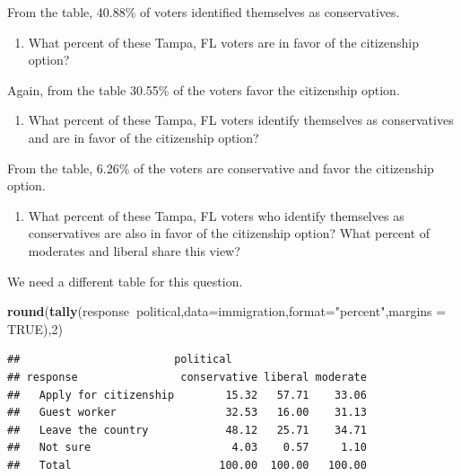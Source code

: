 \documentclass[
]{book}
\newenvironment{Shaded}{\begin{snugshade}}{\end{snugshade}}
\newcommand{\DataTypeTok}[1]{\textcolor[rgb]{0.13,0.29,0.53}{#1}}
\newcommand{\DecValTok}[1]{\textcolor[rgb]{0.00,0.00,0.81}{#1}}
\newcommand{\KeywordTok}[1]{\textcolor[rgb]{0.13,0.29,0.53}{\textbf{#1}}}
\newcommand{\NormalTok}[1]{#1}
\newcommand{\OperatorTok}[1]{\textcolor[rgb]{0.81,0.36,0.00}{\textbf{#1}}}
\newcommand{\OtherTok}[1]{\textcolor[rgb]{0.56,0.35,0.01}{#1}}
\newcommand{\StringTok}[1]{\textcolor[rgb]{0.31,0.60,0.02}{#1}}
\providecommand{\tightlist}{%
  \setlength{\itemsep}{0pt}\setlength{\parskip}{0pt}}
\begin{document}
From the table, 40.88\% of voters identified themselves as conservatives.

\begin{enumerate}
\def\labelenumi{\alph{enumi}.}
\setcounter{enumi}{3}
\tightlist
\item
  What percent of these Tampa, FL voters are in favor of the citizenship option?
\end{enumerate}

Again, from the table 30.55\% of the voters favor the citizenship option.

\begin{enumerate}
\def\labelenumi{\alph{enumi}.}
\setcounter{enumi}{4}
\tightlist
\item
  What percent of these Tampa, FL voters identify themselves as conservatives and are in favor of the citizenship option?
\end{enumerate}

From the table, 6.26\% of the voters are conservative and favor the citizenship option.

\begin{enumerate}
\def\labelenumi{\alph{enumi}.}
\setcounter{enumi}{5}
\tightlist
\item
  What percent of these Tampa, FL voters who identify themselves as conservatives are also in favor of the citizenship option? What percent of moderates and liberal share this view?
\end{enumerate}

We need a different table for this question.

\begin{Shaded}
\begin{Highlighting}[]
\KeywordTok{round}\NormalTok{(}\KeywordTok{tally}\NormalTok{(response}\OperatorTok{~}\NormalTok{political,}\DataTypeTok{data=}\NormalTok{immigration,}\DataTypeTok{format=}\StringTok{"percent"}\NormalTok{,}\DataTypeTok{margins =} \OtherTok{TRUE}\NormalTok{),}\DecValTok{2}\NormalTok{)}
\end{Highlighting}
\end{Shaded}

\begin{verbatim}
##                        political
## response                conservative liberal moderate
##   Apply for citizenship        15.32   57.71    33.06
##   Guest worker                 32.53   16.00    31.13
##   Leave the country            48.12   25.71    34.71
##   Not sure                      4.03    0.57     1.10
##   Total                       100.00  100.00   100.00
\end{verbatim}
\end{document}
